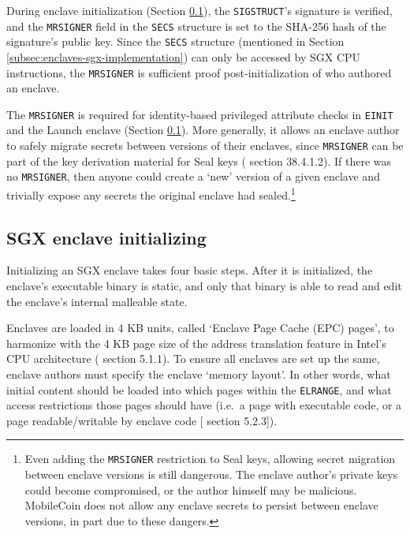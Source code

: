 During enclave initialization (Section \ref{subsec:enclaves-sgx-initializing}), the {\tt SIGSTRUCT}'s signature is verified, and the {\tt MRSIGNER} field in the {\tt SECS} structure is set to the SHA-256 hash of the signature's public key. Since the {\tt SECS} structure (mentioned in Section \ref{subsec:enclaves-sgx-implementation}) can only be accessed by SGX CPU instructions, the {\tt MRSIGNER} is sufficient proof post-initialization of who authored an enclave.

The {\tt MRSIGNER} is required for identity-based privileged attribute checks in {\tt EINIT} and the Launch enclave (Section \ref{subsec:enclaves-sgx-initializing}). More generally, it allows an enclave author to safely migrate secrets between versions of their enclaves, since {\tt MRSIGNER} can be part of the key derivation material for Seal keys (\cite{sgx-manual} section 38.4.1.2). If there was no {\tt MRSIGNER}, then anyone could create a `new' version of a given enclave and trivially expose any secrets the original enclave had sealed.\footnote{\label{footnote:enclave-secret-migration-dangerous}Even adding the {\tt MRSIGNER} restriction to Seal keys, allowing secret migration between enclave versions is still dangerous. The enclave author's private keys could become compromised, or the author himself may be malicious. MobileCoin does not allow any enclave secrets to persist between enclave versions, in part due to these dangers.}%


\subsection{SGX enclave initializing}
\label{subsec:enclaves-sgx-initializing}

Initializing an SGX enclave takes four basic steps. After it is initialized, the enclave's executable binary is static, and only that binary is able to read and edit the enclave's internal malleable state.

Enclaves are loaded in 4 KB units, called `Enclave Page Cache (EPC) pages', to harmonize with the 4 KB page size of the address translation feature in Intel's CPU architecture (\cite{intel-sgx-explained-advanced} section 5.1.1). To ensure all enclaves are set up the same, enclave authors must specify the enclave `memory layout'. In other words, what initial content should be loaded into which pages within the {\tt ELRANGE}, and what access restrictions those pages should have (i.e.\ a page with executable code, or a page readable/writable by enclave code [\cite{intel-sgx-explained-advanced} section 5.2.3]).

